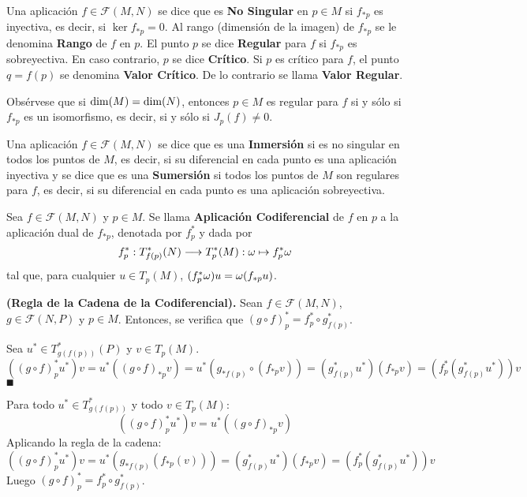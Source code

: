 \documentclass[Cursovd_portada.tex]{subfiles}
\begin{document}
\begin{defi}
Una aplicación $f\in\mathcal{F}(M,N)$ se dice que es {\bf No Singular} en $p\in M$ si $f_{*p}$ es inyectiva, es
decir, si $\ker f_{*p}=0$. Al rango (dimensión de la imagen) de $f_{*p}$ se le denomina {\bf Rango} de $f$ en $p$.
El punto $p$ se dice {\bf Regular} para $f$ si $f_{*p}$ es sobreyectiva. En caso contrario, $p$ se dice {\bf
Crítico}. Si $p$ es crítico para $f$, el punto $q=f(p)$ se denomina {\bf Valor Crítico}. De lo contrario se llama
{\bf Valor Regular}.
\end{defi}
Obsérvese que si ${\rm dim}(M)={\rm dim}(N)$, entonces $p\in M$ es regular para $f$ si y sólo si $f_{*p}$ es un
isomorfismo, es decir, si y sólo si $J_p(f)\neq 0$.
\begin{defi}
Una aplicación $f\in\mathcal{F}(M,N)$ se dice que es una {\bf Inmersión} si es no singular en todos los puntos de
$M$, es decir, si su diferencial en cada punto es una aplicación inyectiva y se dice que es una {\bf Sumersión} si
todos los puntos de $M$ son regulares para $f$, es decir, si su diferencial en cada punto es una aplicación
sobreyectiva.
\end{defi}
\begin{defi}
Sea $f\in\mathcal{F}(M,N)$ y $p\in M$. Se llama {\bf Aplicación Co\-di\-fe\-ren\-cial} de $f$ en $p$ a la
aplicación dual de $f_{*p}$, denotada por $f_p^*$ y dada por
$$f_p^*:T_{f(p)}^*(N)\longrightarrow T_p^*(M):\omega\mapsto f_p^*\omega$$
tal que, para cualquier $u\in T_p(M)$, $(f_p^*\omega)u=\omega(f_{*p}u)$.
\end{defi}
\begin{prop}
{\bf (Regla de la Cadena de la Codiferencial).} Sean $f\in\mathcal{F}(M,N)$, $g\in\mathcal{F}(N,P)$ y $p\in M$.
Entonces, se verifica que $(g\circ f)_p^*=f_p^*\circ g_{f(p)}^*$.
\end{prop}
\begin{dem}
Sea $u^*\in T^*_{g(f(p))}(P)$ y $v\in T_p(M)$.  $$((g\circ f)^*_p u^*)v=u^*((g\circ f)_{*p}v)=u^*(g_{*f(p)}\circ (f_{*p}v))=(g^*_{f(p)}u^*)(f_{*p}v)=(f^*_p(g^*_{f(p)}u^*))v$$ $\QED$
\end{dem}

\begin{dem}
Para todo $u^* \in T^*_{g(f(p))}$ y todo $v \in T_p(M)$:
\[ ((g \circ f)^*_p u^*)v = u^*((g \circ f)_{*p} v) \]
Aplicando la regla de la cadena:
\[ ((g \circ f)^*_p u^*)v = u^*( g_{*f(p)} (f_{*p}(v))) = (g_{f(p)}^*u^*) (f_{*p} v) = (f_p^*(g_{f(p)}^*u^*))v\]
Luego $(g \circ f)^*_p  = f_p^* \circ g_{f(p)}^*$.
\end{dem}
\end{document}
